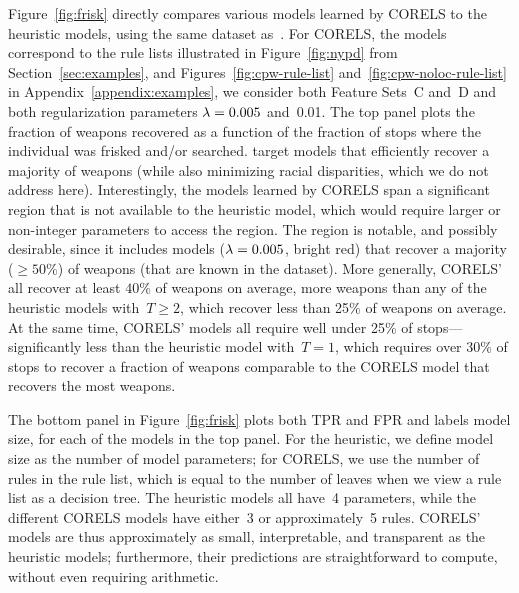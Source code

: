 Figure~\ref{fig:frisk} directly compares various models learned by CORELS to the heuristic models,
using the same dataset as~\citet{Goel16}.
%
For CORELS, the models correspond to the rule lists illustrated in Figure~\ref{fig:nypd}
from Section~\ref{sec:examples}, and Figures~\ref{fig:cpw-rule-list} and~\ref{fig:cpw-noloc-rule-list}
in Appendix~\ref{appendix:examples}, we consider both Feature Sets~C and~D
and both regularization parameters ${{\lambda} = 0.005}$ and~0.01.
%
The top panel plots the fraction of weapons recovered as a function of the fraction of
stops where the individual was frisked and/or searched.
%
\citep{Goel16} target models that efficiently recover a majority of weapons
(while also minimizing racial disparities, which we do not address here).
%
Interestingly, the models learned by CORELS span a significant region that is not available
to the heuristic model, which would require larger or non-integer parameters to access the region.
%
The region is notable, and possibly desirable, since it includes models (${{\lambda} = 0.005}$, bright red)
that recover a majority (${\ge 50\%}$) of weapons (that are known in the dataset).
%
More generally, CORELS' all recover at least ${40\%}$ of weapons
on average, \ie more weapons than any of the heuristic models with~${T \ge 2}$,
which recover less than 25\% of weapons on average.
%
At the same time, CORELS' models all require well under 25\% of stops---significantly
less than the heuristic model with~${T = 1}$, which requires over 30\% of stops
to recover a fraction of weapons comparable to the CORELS model that recovers the most weapons.

The bottom panel in Figure~\ref{fig:frisk} plots both TPR and FPR and labels model size,
for each of the models in the top panel.
%
For the heuristic, we define model size as the number of model parameters;
for CORELS, we use the number of rules in the rule list,
which is equal to the number of leaves when we view a rule list as a decision tree.
%
The heuristic models all have~4 parameters, while the different CORELS models have
either~3 or approximately~5 rules.
%
CORELS' models are thus approximately as small, interpretable, and transparent
as the heuristic models; furthermore, their predictions are straightforward
to compute, without even requiring arithmetic.


